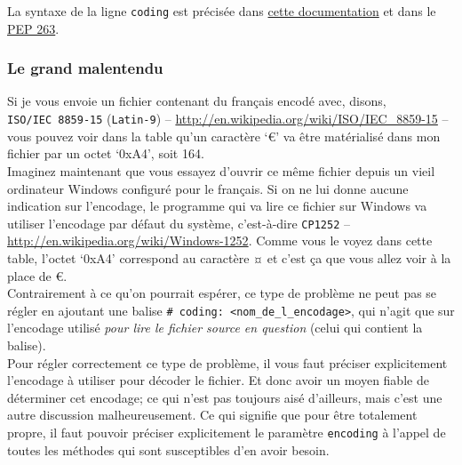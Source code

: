     \begin{Shaded}
\begin{Highlighting}[]
\end{Highlighting}
\end{Shaded}

    La syntaxe de la ligne \texttt{coding} est précisée dans
\href{https://docs.python.org/3/reference/lexical_analysis.html\#encoding-declarations}{cette
documentation} et dans le
\href{https://www.python.org/dev/peps/pep-0263/}{PEP 263}.

    \hypertarget{le-grand-malentendu}{%
\subsubsection{Le grand malentendu}\label{le-grand-malentendu}}

    Si je vous envoie un fichier contenant du français encodé avec, disons,
\texttt{ISO/IEC\ 8859-15} (\texttt{Latin-9}) --
\href{http://en.wikipedia.org/wiki/ISO/IEC\_8859-15}{http://en.wikipedia.org/wiki/ISO/IEC\_8859-15} -- vous pouvez voir dans
la table qu'un caractère `€' va être matérialisé dans mon fichier par un
octet `0xA4', soit 164.\\

Imaginez maintenant que vous essayez d'ouvrir ce même fichier depuis un
vieil ordinateur Windows configuré pour le français. Si on ne lui donne
aucune indication sur l'encodage, le programme qui va lire ce fichier
sur Windows va utiliser l'encodage par défaut du système, c'est-à-dire
\texttt{CP1252} -- \href{http://en.wikipedia.org/wiki/Windows-1252}{http://en.wikipedia.org/wiki/Windows-1252}. Comme vous
le voyez dans cette table, l'octet `0xA4' correspond au caractère ¤ et
c'est ça que vous allez voir à la place de €.\\

Contrairement à ce qu'on pourrait espérer, ce type de problème ne peut
pas se régler en ajoutant une balise
\texttt{\#\ coding:\ \textless{}nom\_de\_l\_encodage\textgreater{}}, qui
n'agit que sur l'encodage utilisé \emph{pour lire le fichier source en
question} (celui qui contient la balise).\\

Pour régler correctement ce type de problème, il vous faut préciser
explicitement l'encodage à utiliser pour décoder le fichier. Et donc
avoir un moyen fiable de déterminer cet encodage; ce qui n'est pas
toujours aisé d'ailleurs, mais c'est une autre discussion
malheureusement. Ce qui signifie que pour être totalement propre, il
faut pouvoir préciser explicitement le paramètre \texttt{encoding} à
l'appel de toutes les méthodes qui sont susceptibles d'en avoir besoin.

